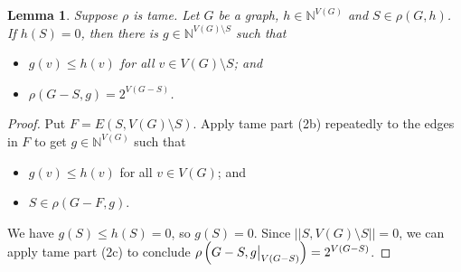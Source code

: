 \documentclass[12pt]{article}
\theoremstyle{plain}
\newtheorem{lem}[thm]{Lemma}
\theoremstyle{definition}
\theoremstyle{remark}
\newcommand{\IN}{\mathbb{N}}
\newcommand{\parens}[1]{\left( #1 \right)}
\newcommand\restr[2]{{%
  \left.\kern-\nulldelimiterspace %
  #1 %
  \vphantom{\big|} %
  \right|_{#2} %
  }}
\begin{document}
\begin{lem}\label{CutOff}
	Suppose $\rho$ is tame. Let $G$ be a graph, $h \in \IN^{V(G)}$ and $S \in \rho(G, h)$.  If $h(S) = 0$, then there is $g \in \IN^{V(G) \setminus S}$ such that
	\begin{itemize}
		\item $g(v) \le h(v)$ for all $v \in V(G) \setminus S$; and
		\item $\rho(G - S, g) = 2^{V(G-S)}$.
	\end{itemize}
\end{lem}
\begin{proof}
	Put $F = E(S, V(G) \setminus S)$.  Apply tame part (2b) repeatedly to the edges in $F$ to get $g \in \IN^{V(G)}$ such that
	\begin{itemize}
		\item $g(v) \le h(v)$ for all $v \in V(G)$; and
		\item $S \in \rho(G - F, g)$.
	\end{itemize}
	 We have $g(S) \le h(S) = 0$, so $g(S) = 0$.  Since $||S, V(G) \setminus S|| = 0$, we can apply tame part (2c) to conclude $\rho\parens{G - S, \restr{g}{V(G-S)}} = 2^{V(G-S)}$.
\end{proof}
\end{document}
